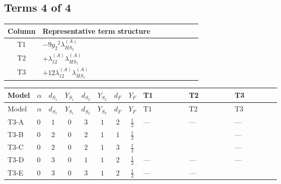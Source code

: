 \documentclass[8pt]{article}
\begin{document}
\begin{landscape}
\subsection*{Terms 4 of 4}
\begin{center}
\begin{tabular}{@{}c >{\raggedright\arraybackslash}p{0.82\linewidth}@{}}
\toprule
Column & Representative term structure \\
\midrule
T1 & \(\displaystyle -9 {g_2}^2 {\lambda_{HS_2}^{(A)}}\) \\
\midrule
T2 & \(\displaystyle +{\lambda_{12}^{(A)}} {\lambda_{HS_1}^{(A)}}\) \\
\midrule
T3 & \(\displaystyle +12 {\lambda_{12}^{(A)}} {\lambda_{HS_1}^{(A)}}\) \\
\midrule
\bottomrule
\end{tabular}
\end{center}
\smallskip
\tiny
\begin{longtable}{@{}llcccccc >{\raggedright\arraybackslash}p{0.21\linewidth} >{\raggedright\arraybackslash}p{0.21\linewidth} >{\raggedright\arraybackslash}p{0.21\linewidth}@{}}
\toprule
Model & $\alpha$ & $d_{S_1}$ & $Y_{S_1}$ & $d_{S_2}$ & $Y_{S_2}$ & $d_F$ & $Y_F$ & T1 & T2 & T3 \\
\midrule
\endfirsthead
\toprule
Model & $\alpha$ & $d_{S_1}$ & $Y_{S_1}$ & $d_{S_2}$ & $Y_{S_2}$ & $d_F$ & $Y_F$ & T1 & T2 & T3 \\
\midrule
\endhead
T3-A & $0$ & $1$ & $0$ & $3$ & $1$ & $2$ & $\frac{1}{2}$ & --- & --- & --- \\
\midrule
T3-B & $0$ & $2$ & $0$ & $2$ & $1$ & $1$ & $\frac{1}{2}$ & \scriptsize\adjustbox{max width=\linewidth}{$\begin{gathered} -9 {g_2}^2 {\lambda_{HS_2}^{(A)}}\end{gathered}$} & \scriptsize\adjustbox{max width=\linewidth}{$\begin{gathered} +{\lambda_{12}^{(A)}} {\lambda_{HS_1}^{(A)}}\end{gathered}$} & --- \\
\midrule
T3-C & $0$ & $2$ & $0$ & $2$ & $1$ & $3$ & $\frac{1}{2}$ & \scriptsize\adjustbox{max width=\linewidth}{$\begin{gathered} -9 {g_2}^2 {\lambda_{HS_2}^{(A)}}\end{gathered}$} & \scriptsize\adjustbox{max width=\linewidth}{$\begin{gathered} +{\lambda_{12}^{(A)}} {\lambda_{HS_1}^{(A)}}\end{gathered}$} & --- \\
\midrule
T3-D & $0$ & $3$ & $0$ & $1$ & $1$ & $2$ & $\frac{1}{2}$ & --- & --- & --- \\
\midrule
T3-E & $0$ & $3$ & $0$ & $3$ & $1$ & $2$ & $\frac{1}{2}$ & --- & --- & \scriptsize\adjustbox{max width=\linewidth}{$\begin{gathered} +12 {\lambda_{12}^{(A)}} {\lambda_{HS_1}^{(A)}}\end{gathered}$} \\
\midrule
\bottomrule
\end{longtable}
\clearpage

\end{landscape}
\end{document}
